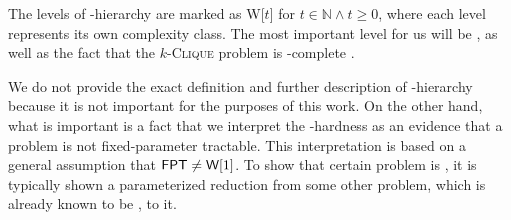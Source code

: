The levels of \W-hierarchy are marked as \textsf{W}[$t$] for $t \in \mathbb{N} \wedge t \geq 0$,
where each level represents its own complexity class.
The most important level for us will be \Wone,
as well as the fact that the $k$-\textsc{Clique} problem is \Wone-complete \cite{Downey1999}.

We do not provide the exact definition and further description of \W-hierarchy
because it is not important for the purposes of this work.
On the other hand, what is important is a fact that we interpret the \W-hardness as an evidence that
a problem is not fixed-parameter tractable.
This interpretation is based on a general assumption that $\textsf{FPT} \neq \textsf{W}[1]$.
To show that certain problem is \Wh, it is typically shown a parameterized reduction from some other problem,
which is already known to be \Wh, to it.
